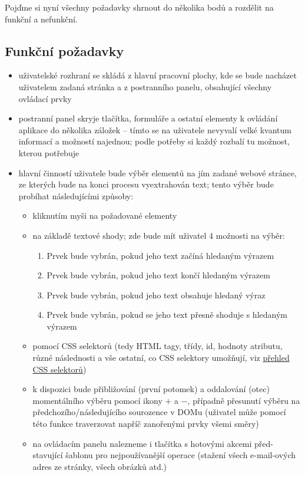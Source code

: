 \documentclass[thesis=B,czech]{FITthesis}[2012/06/26]
\begin{document}
Pojďme si nyní všechny požadavky shrnout do několika bodů a rozdělit na funkční a nefunkční.

\subsection{Funkční požadavky}
\begin{itemize}
	\item uživatelské rozhraní se skládá z hlavní pracovní plochy, kde se bude nacházet uživatelem zadaná stránka a z postranního panelu, obsahující všechny ovládací prvky
	\item postranní panel skryje tlačítka, formuláře a ostatní elementy k ovládání aplikace do několika záložek -- tímto se na uživatele nevyvalí velké kvantum informací a možností najednou; podle potřeby si každý rozbalí tu možnost, kterou potřebuje
	\item hlavní činností uživatele bude výběr elementů na jím zadané webové stránce, ze kterých bude na konci procesu vyextrahován text; tento výběr bude probíhat následujícími způsoby:
	\begin{itemize}
		\item kliknutím myši na požadované elementy
		\item na základě textové shody; zde bude mít uživatel 4 možnosti na výběr:
		\begin{enumerate}
			\item Prvek bude vybrán, pokud jeho text začíná hledaným výrazem
			\item Prvek bude vybrán, pokud jeho text končí hledaným výrazem
			\item Prvek bude vybrán, pokud jeho text obsahuje hledaný výraz
			\item Prvek bude vybrán, pokud se jeho text přesně shoduje s hledaným výrazem
		\end{enumerate}
		\item pomocí CSS selektorů (tedy HTML tagy, třídy, id, hodnoty atributu, různé následnosti a vše ostatní, co CSS selektory umožňují, viz \href{https://www.w3schools.com/cssref/css_selectors.asp}{přehled CSS selektorů})
		\item k dispozici bude přibližování (první potomek) a oddalování (otec) momentálního výběru pomocí ikony $+$ a $-$, případně přesunutí výběru na předchozího/následujícího sourozence v DOMu (uživatel může pomocí této funkce traverzovat napříč zanořenými prvky všemi směry)
		\item na ovládacím panelu nalezneme i tlačítka s hotovými akcemi před-stavující šablonu pro nejpoužívanější operace (stažení všech e-mail-ových adres ze stránky, všech obrázků atd.)

\end{itemize}
\end{itemize}
\end{document}
